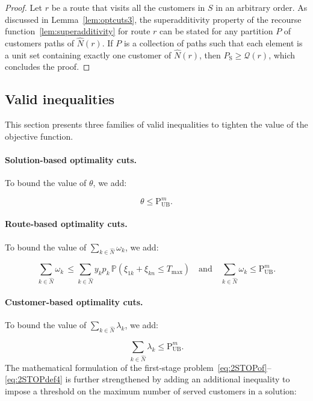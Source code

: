 \documentclass[11pt]{article}
\theoremstyle{definition}
\begin{document}
\begin{proof}
Let $r$ be a route that visits all the customers in $S$ in an arbitrary order.
As discussed in Lemma~\ref{lem:optcuts3}, the superadditivity property of the recourse function~\ref{lem:superadditivity} for route $r$ can be stated for any partition $P$ of customers paths of $\hat{N}(r)$.
%
If $P$ is a collection of paths such that each element is a unit set containing exactly one customer of $\hat{N}(r)$, then $P_{\text{S}} \geq \mathcal{Q}(r)$, which concludes the proof.
%
\end{proof}

\subsection{Valid inequalities}
\label{ssec:vi}

\noindent This section presents three families of valid inequalities to tighten the value of the objective function.

\paragraph{Solution-based optimality cuts.} To bound the value of $\theta$, we add:

\[\theta \leq \text{P}^m_{\text{UB}}.\]

\paragraph{Route-based optimality cuts.} To bound the value of $\sum_{k \in \hat{N}} \omega_k$, we add:

\[\sum_{k \in \hat{N}} \omega_k \, \leq \sum_{k \in \hat{N}} y_{k} p_k \, \mathbb{P}(\xi_{1k} + \xi_{kn} \leq T_{\max}) \quad \text{and} \quad \sum_{k \in \hat{N}} \omega_k \leq \text{P}^m_{\text{UB}}.\]

\paragraph{Customer-based optimality cuts.} To bound the value of $\sum_{k \in \hat{N}} \lambda_k$, we add:

\[\sum_{k \in \hat{N}} \lambda_k \leq \text{P}^m_{\text{UB}}.\]
%
The mathematical formulation of the first-stage problem~\eqref{eq:2STOPof}--\eqref{eq:2STOPdef4} is further strengthened by adding an additional inequality to impose a threshold on the maximum number of served customers in a solution:
\end{document}
